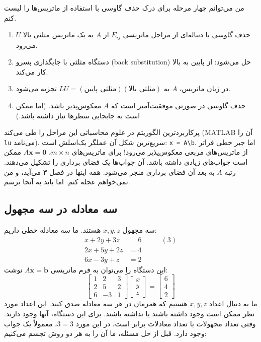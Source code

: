 \documentclass[12pt, a4paper]{book}
\begin{document}
	من می‌توانم چهار مرحله برای درک حذف گاوسی با استفاده از ماتریس‌ها را لیست کنم.
	\begin{enumerate}
		\item حذف گاوسی با دنباله‌ای از مراحل ماتریسی \( E_{ij} \) از \( A \) به یک ماتریس مثلثی بالا \( U \) می‌رود.
		\item دستگاه مثلثی با جایگذاری پسرو (back substitution) حل می‌شود: از پایین به بالا کار می‌کند.
		\item در زبان ماتریس، \( A \) به \( LU = (\text{مثلثی پایین}) (\text{مثلثی بالا}) \) تجزیه می‌شود.
		\item حذف گاوسی در صورتی موفقیت‌آمیز است که \( A \) معکوس‌پذیر باشد. (اما ممکن است به جابجایی سطرها نیاز داشته باشد.)
	\end{enumerate}
	پرکاربردترین الگوریتم در علوم محاسباتی این مراحل را طی می‌کند (MATLAB آن را \texttt{lu} می‌نامد). سریع‌ترین شکل آن عملگر بک‌اسلش است: \texttt{x = A\textbackslash b}. اما جبر خطی فراتر از ماتریس‌های مربعی معکوس‌پذیر می‌رود! برای ماتریس‌های \( m \times n \)، \( A\mathbf{x} = \mathbf{0} \) ممکن است جواب‌های زیادی داشته باشد. آن جواب‌ها یک فضای برداری را تشکیل می‌دهند. رتبه \( A \) به بعد آن فضای برداری منجر می‌شود. همه اینها در فصل ۳ می‌آید، و من نمی‌خواهم عجله کنم. اما باید به آنجا برسم.
	
	\subsection*{سه معادله در سه مجهول}
	سه مجهول \( x, y, z \) هستند. ما سه معادله خطی داریم:
	\begin{align*}
		x + 2y + 3z &= 6 \quad\quad &(3) \\
		2x + 5y + 2z &= 4 \\
		6x - 3y + z &= 2
	\end{align*}
	این دستگاه را می‌توان به فرم ماتریسی \(A\mathbf{x}=\mathbf{b}\) نوشت:
	\[
	\begin{bmatrix} 1 & 2 & 3 \\ 2 & 5 & 2 \\ 6 & -3 & 1 \end{bmatrix} \begin{bmatrix} x \\ y \\ z \end{bmatrix} = \begin{bmatrix} 6 \\ 4 \\ 2 \end{bmatrix}
	\]
	ما به دنبال اعداد \( x, y, z \) هستیم که همزمان در هر سه معادله صدق کنند. این اعداد مورد نظر ممکن است وجود داشته باشند یا نداشته باشند. برای این دستگاه، آنها وجود دارند. وقتی تعداد مجهولات با تعداد معادلات برابر است، در این مورد \( 3=3 \)، معمولاً یک جواب وجود دارد.
	قبل از حل مسئله، ما آن را به هر دو روش تجسم می‌کنیم:
	
\end{document}
